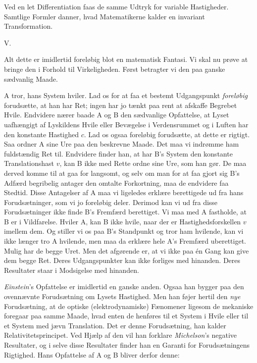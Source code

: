 \documentclass[12pt,a4paper]{article}
\newcommand{\opage}[1]{\marginnote{\footnotesize\textit{[#1]}}}
\begin{document}
Ved en let Differentiation faas de samme Udtryk for variable Hastigheder.
Samtlige Formler danner, hvad Matematikerne kalder \guillemotleft en
invariant Transformation\guillemotright.

\begin{center}
V.
\end{center}

Alt dette er imidlertid foreløbig blot en matematisk Fantasi. Vi skal nu
prøve at bringe den i Forhold til Virkeligheden. Først betragter vi den
paa ganske sædvanlig Maade.

A tror, hans System hviler. Lad os for at faa et bestemt Udgangspunkt
\emph{foreløbig} forudsætte, at han har Ret; ingen har jo tænkt paa rent
at afskaffe Begrebet Hvile. Endvidere nærer
\opage{14} baade A og B den sædvanlige Opfattelse, at Lyset uafhængigt af Lyskildens
Hvile eller Bevægelse i Verdensrummet og i Luften har den konstante
Hastighed $c$. Lad os ogsaa foreløbig forudsætte, at dette er rigtigt. Saa
ordner A sine Ure paa den beskrevne Maade. Det maa vi indrømme ham
fuldstændig Ret til. Endvidere finder han, at har B's System den konstante
Translationshast $v$, kan B ikke med Rette ordne sine Ure, som han gør. De
maa derved komme til at gaa for langsomt, og selv om man for at faa gjort
sig B's Adfærd begribelig antager den omtalte Forkortning, maa de endvidere
faa Stedtid. Disse Antagelser af A maa vi ligeledes erklære berettigede ud
fra hans Forudsætninger, som vi jo foreløbig deler. Derimod kan vi ud fra
disse Forudsætninger ikke finde B's Fremfærd berettiget. Vi maa med A
fastholde, at B er i Vildfarelse. Hviler A, kan B ikke hvile, naar der er
Hastighedsforskellen $v$ imellem dem. Og stiller vi os paa B's Standpunkt
og tror ham hvilende, kan vi ikke længer tro A hvilende, men maa da erklære
hele A's Fremfærd uberettiget. Mulig har de begge Uret. Men det afgørende
er, at vi ikke paa én Gang kan give dem begge Ret. Deres Udgangspunkter kan
ikke forliges med hinanden. Deres Resultater staar i Modsigelse med
hinanden.

\emph{Einstein}'s Opfattelse er imidlertid en ganske anden. Ogsaa han
bygger paa den ovennævnte Forudsætning om Lysets Hastighed. Men han føjer
hertil den \emph{nye} Forudsætning, at de optiske (elektrodynamiske)
Fænomener \guillemotleft ligesom de mekaniske\guillemotright{} foregaar paa
samme Maade, hvad enten de henføres til et System i Hvile eller til et
System med jævn Translation. Det er denne Forudsætning, han kalder
\guillemotleft Relativitetsprincipet\guillemotright. Ved Hjælp af den vil
han forklare \emph{Michelson}'s negative Resultater, og i selve disse
Resultater finder han en Garanti for Forudsætningens Rigtighed. Hans
Opfattelse af A og B bliver derfor denne:
\end{document}

